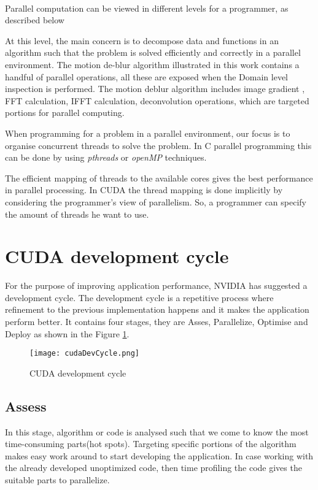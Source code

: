 \paragraph*{} Parallel computation can be viewed in different levels for a programmer, as described below
\begin{description}
\enlargethispage{-\baselineskip}
\item [Domain level] \hfill \break At this level, the main concern is to decompose data and functions in an algorithm such that the problem is solved efficiently and correctly in a parallel environment. The motion de-blur algorithm illustrated in this work contains a handful of parallel operations, all these are exposed when the Domain level inspection is performed. The motion deblur algorithm includes image gradient , FFT calculation, IFFT calculation, deconvolution operations, which are targeted portions for parallel computing.
\item [Logic level] \hfill \break When programming for a problem in a parallel environment, our focus is to organise concurrent threads to solve the problem. In C parallel programming this can be done by using \textit{pthreads} or \textit{openMP} techniques.
\item[Hardware level] \hfil \break 
The efficient mapping of threads to the available cores gives the best performance in parallel processing. In CUDA the thread mapping is done implicitly by considering the programmer's view of parallelism. So, a programmer can specify the amount of threads he want to use.
\end{description}
\section{CUDA development cycle}
 For the purpose of improving application performance, NVIDIA has suggested a development cycle. The development cycle is a repetitive process where refinement to the previous implementation happens and it makes the application perform better. It contains four stages, they are Asses, Parallelize, Optimise and Deploy as shown in the Figure \ref{Figure:2.1}.
\begin{figure}[h!]
  \centering
  \texttt{[image: cudaDevCycle.png]}
  \caption{CUDA development cycle}
  \label{Figure:2.1}
\end{figure}
\subsection{Assess}
In this stage, algorithm or code is analysed such that we come to know the most time-consuming parts(hot spots). Targeting specific portions of the algorithm makes easy work around to start developing the application. In case working with the already developed unoptimized code, then time profiling the code gives the suitable parts to parallelize.
